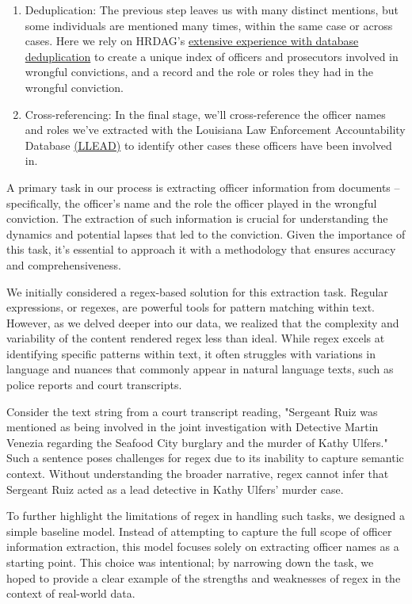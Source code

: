 \documentclass{article}
\begin{document}
\begin{enumerate}
    \item Deduplication: The previous step leaves us with many distinct mentions, but some individuals are mentioned many times, within the same case or across cases. Here we rely on HRDAG's \href{https://hrdag.org/tech-notes/adaptive-blocking-writeup-1.html}{extensive experience with database deduplication} to create a unique index of officers and prosecutors involved in wrongful convictions, and a record and the role or roles they had in the wrongful conviction.

    \item Cross-referencing: In the final stage, we'll cross-reference the officer names and roles we've extracted with the Louisiana Law Enforcement Accountability Database \href{https://llead.co/}{(LLEAD)} to identify other cases these officers have been involved in.
\end{enumerate}

A primary task in our process is extracting officer information from documents – specifically, the officer's name and the role the officer played in the wrongful conviction. The extraction of such information is crucial for understanding the dynamics and potential lapses that led to the conviction. Given the importance of this task, it's essential to approach it with a methodology that ensures accuracy and comprehensiveness.

We initially considered a regex-based solution for this extraction task. Regular expressions, or regexes, are powerful tools for pattern matching within text. However, as we delved deeper into our data, we realized that the complexity and variability of the content rendered regex less than ideal. While regex excels at identifying specific patterns within text, it often struggles with variations in language and nuances that commonly appear in natural language texts, such as police reports and court transcripts.

Consider the text string from a court transcript reading, "Sergeant Ruiz was mentioned as being involved in the joint investigation with Detective Martin Venezia regarding the Seafood City burglary and the murder of Kathy Ulfers." Such a sentence poses challenges for regex due to its inability to capture semantic context. Without understanding the broader narrative, regex cannot infer that Sergeant Ruiz acted as a lead detective in Kathy Ulfers' murder case.

To further highlight the limitations of regex in handling such tasks, we designed a simple baseline model. Instead of attempting to capture the full scope of officer information extraction, this model focuses solely on extracting officer names as a starting point. This choice was intentional; by narrowing down the task, we hoped to provide a clear example of the strengths and weaknesses of regex in the context of real-world data.
\end{document}
